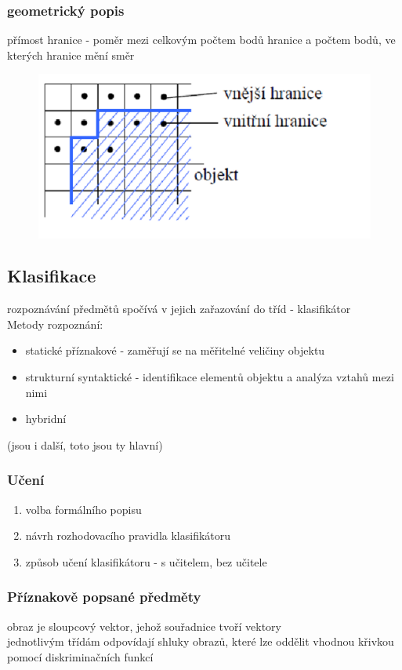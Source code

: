 \subsubsection{geometrický popis}
přímost hranice - poměr mezi celkovým počtem bodů hranice a počtem bodů, ve kterých hranice mění směr\\
\begin{figure}[H]
    \includegraphics[scale = 0.2]{images/geometricky_popis.png}
\end{figure}
\newpage
\subsection{Klasifikace}
rozpoznávání předmětů spočívá v jejich zařazování do tříd - klasifikátor\\
Metody rozpoznání:
\begin{itemize}
    \item statické příznakové - zaměřují se na měřitelné veličiny objektu
    \item strukturní syntaktické - identifikace elementů objektu a analýza vztahů mezi nimi
    \item hybridní
\end{itemize}
(jsou i další, toto jsou ty hlavní)\\
\subsubsection{Učení}
\begin{enumerate}
    \item volba formálního popisu
    \item návrh rozhodovacího pravidla klasifikátoru
    \item způsob učení klasifikátoru - s učitelem, bez učitele
\end{enumerate}
\subsubsection{Příznakově popsané předměty}
obraz je sloupcový vektor, jehož souřadnice tvoří vektory\\
jednotlivým třídám odpovídají shluky obrazů, které lze oddělit vhodnou křivkou pomocí diskriminačních funkcí

